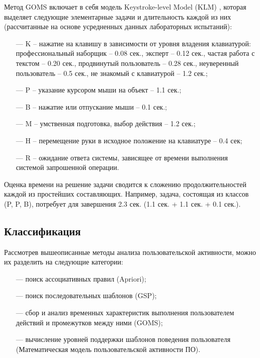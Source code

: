 Метод GOMS включает в себя модель Keystroke-level Model (KLM) \cite{11}, которая выделяет следующие элементарные задачи и длительность каждой из них (рассчитанные на основе усредненных данных лабораторных испытаний):

\begin{itemize}
	\item[---] K – нажатие на клавишу в зависимости от уровня владения клавиатурой: профессиональный	наборщик – 0.08 сек., эксперт – 0.12 сек., частая работа с текстом – 0.20 сек., продвинутый пользователь – 0.28 сек., неуверенный пользователь – 0.5 сек., не знакомый с клавиатурой – 1.2 сек.;
	\item[---] P – указание курсором мыши на объект – 1.1 сек.;
	\item[---] B – нажатие или отпускание мыши – 0.1 сек.;
	\item[---] M – умственная подготовка, выбор действия – 1.2 сек.;
	\item[---] H – перемещение руки в исходное положение на клавиатуре – 0.4 сек;
	\item[---] R – ожидание ответа системы, зависящее от	времени выполнения системой запрошенной операции.
\end{itemize}

Оценка времени на решение задачи сводится к сложению продолжительностей каждой из простейших составляющих. Например, задача, состоящая из классов (P, P, B), потребует для завершения 2.3 сек. (1.1 сек. + 1.1 сек. + 0.1 сек.).

\subsection{Классификация} %
Рассмотрев вышеописанные методы анализа пользовательской активности, можно их разделить на следующие категории:
\begin{itemize}
	\item[---] поиск ассоциативных правил (Apriori);
	\item[---] поиск последовательных шаблонов (GSP);
	\item[---] сбор и анализ временных характеристик выполнения пользователем действий и промежутков между ними (GOMS);
	\item[---] вычисление уровней поддержки шаблонов поведения пользователя (Математическая модель пользовательской активности ПО).
\end{itemize}

